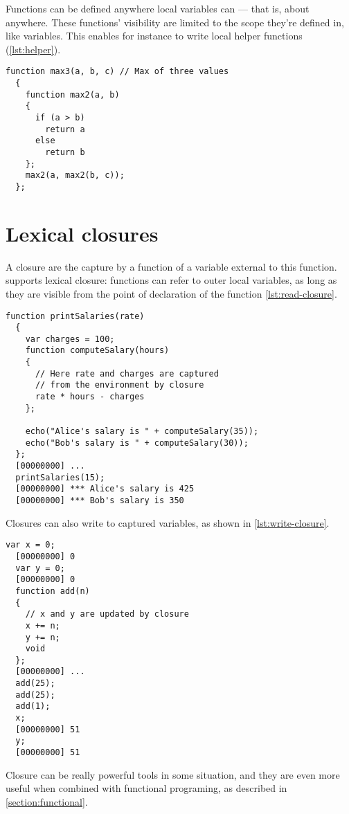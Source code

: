 \documentclass[openright,twoside,12pt]{report}
\begin{document}
Functions can be defined anywhere local variables can --- that is,
about anywhere. These functions' visibility are limited to the scope
they're defined in, like variables. This enables for instance to write
local helper functions (\autoref{lst:helper}).

\begin{lstlisting}[caption=Local helper function, label=lst:helper]
  function max3(a, b, c) // Max of three values
  {
    function max2(a, b)
    {
      if (a > b)
        return a
      else
        return b
    };
    max2(a, max2(b, c));
  };
\end{lstlisting}

\section{Lexical closures}

A closure are the capture by a function of a variable external to this
function. \urbi supports lexical closure: functions can refer to outer
local variables, as long as they are visible from the point of
declaration of the function \autoref{lst:read-closure}.

\begin{lstlisting}[caption=Capturing variables with lexical closures,
  label=lst:read-closure]
  function printSalaries(rate)
  {
    var charges = 100;
    function computeSalary(hours)
    {
      // Here rate and charges are captured
      // from the environment by closure
      rate * hours - charges
    };

    echo("Alice's salary is " + computeSalary(35));
    echo("Bob's salary is " + computeSalary(30));
  };
  [00000000] ...
  printSalaries(15);
  [00000000] *** Alice's salary is 425
  [00000000] *** Bob's salary is 350
\end{lstlisting}

Closures can also write to captured variables, as shown in
\autoref{lst:write-closure}.

\begin{lstlisting}[caption=Updating captured variables,
  label=lst:write-closure]
  var x = 0;
  [00000000] 0
  var y = 0;
  [00000000] 0
  function add(n)
  {
    // x and y are updated by closure
    x += n;
    y += n;
    void
  };
  [00000000] ...
  add(25);
  add(25);
  add(1);
  x;
  [00000000] 51
  y;
  [00000000] 51
\end{lstlisting}

Closure can be really powerful tools in some situation, and they are
even more useful when combined with functional programing, as
described in \autoref{section:functional}.
\end{document}
